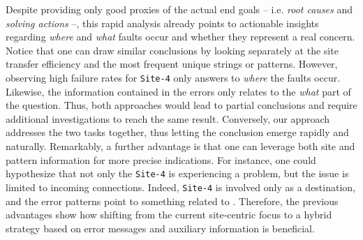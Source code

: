 Despite providing only good proxies of the actual end goals -- i.e. \textit{root causes} and \textit{solving actions} --, this rapid analysis already points to actionable insights regarding \textit{where} and \textit{what} faults occur and whether they represent a real concern.
Notice that one can draw similar conclusions by looking separately at the site transfer efficiency and the most frequent unique strings or patterns. 
However, observing high failure rates for \texttt{Site-4} only answers to \textit{where} the faults occur. 
Likewise, the information contained in the errors only relates to the \textit{what} part of the question.
Thus, both approaches would lead to partial conclusions and require additional investigations to reach the same result.
Conversely, our approach addresses the two tasks together, thus letting the conclusion emerge rapidly and naturally. 
Remarkably, a further advantage is that one can leverage both site and pattern information for more precise indications.
For instance, one could hypothesize that not only the \texttt{Site-4} is experiencing a problem, but the issue is limited to incoming connections. Indeed, \texttt{Site-4} is involved only as a destination, and the error patterns point to something related to .
Therefore, the previous advantages show how shifting from the current site-centric focus to a hybrid strategy based on error messages and auxiliary information is beneficial.
